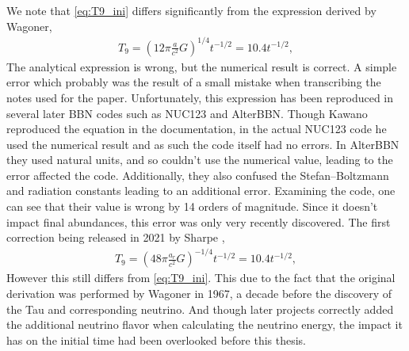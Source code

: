 We note that \eqref{eq:T9_ini} differs significantly from the expression derived by Wagoner\cite{Wagoner67},
\begin{align}
    T_9=(12\pi\frac{a}{c^2}G)^{1/4}t^{-1/2}=10.4t^{-1/2},
\end{align}
The analytical expression is wrong, but the numerical result is correct. A simple error which probably was the result of a small mistake when transcribing the notes used for the paper. Unfortunately, this expression has been reproduced in several later BBN codes such as NUC123\cite{Kawano} and AlterBBN\cite{AlterBBN}. Though Kawano reproduced the equation in the documentation, in the actual NUC123 code he used the numerical result and as such the code itself had no errors. In AlterBBN they used natural units, and so couldn't use the numerical value, leading to the error affected the code. Additionally, they also confused the Stefan–Boltzmann and radiation constants leading to an additional error. Examining the code, one can see that their value is wrong by 14 orders of magnitude. %
Since it doesn't impact final abundances, this error was only very recently discovered. The first correction being released in 2021 by Sharpe \cite{sharpe2021big},
\begin{align}
    T_9=(48\pi\frac{a_r}{c^2}G)^{-1/4}t^{-1/2}=10.4t^{-1/2},
\end{align}
However this still differs from \eqref{eq:T9_ini}. This due to the fact that the original derivation was performed by Wagoner in 1967, a decade before the discovery of the Tau and corresponding neutrino. And though later projects correctly added the additional neutrino flavor when calculating the neutrino energy, the impact it has on the initial time had been overlooked before this thesis. 









